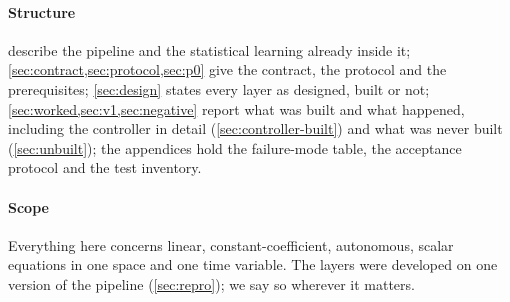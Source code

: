 \documentclass[11pt]{article}
\theoremstyle{plain}
\theoremstyle{definition}
\theoremstyle{remark}
\begin{document}
\paragraph{Structure}  describe the pipeline and the statistical learning already inside it; \cref{sec:contract,sec:protocol,sec:p0} give the contract, the protocol and the prerequisites; \cref{sec:design} states every layer as designed, built or not;
\cref{sec:worked,sec:v1,sec:negative} report what was built and what happened, including the controller in detail (\cref{sec:controller-built}) and what was never built (\cref{sec:unbuilt}); the appendices hold the failure-mode table, the acceptance protocol and the test inventory.

\paragraph{Scope} Everything here concerns linear, constant-coefficient, autonomous, scalar equations in one space and one
time variable. The layers were developed on one version of the pipeline (\cref{sec:repro}); we say so wherever it matters.
\end{document}
